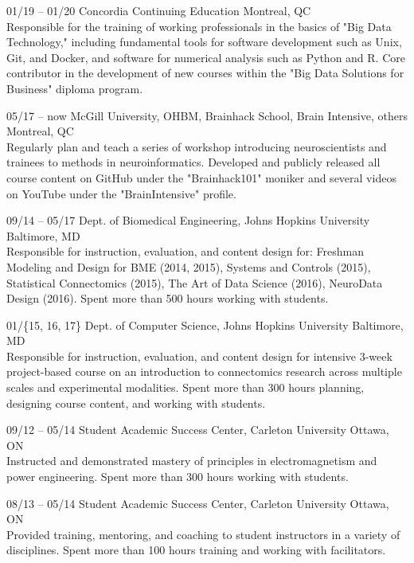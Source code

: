 \documentclass[]{friggeri-cv} %
\begin{document}
\begin{entrylist}
\entry
{01/19 -- 01/20}
{Concordia Continuing Education}
{Montreal, QC}
{ \\
Responsible for the training of working professionals in the basics of "Big Data Technology," including fundamental
tools for software development such as Unix, Git, and Docker, and software for numerical analysis such as Python and R.
Core contributor in the development of new courses within the "Big Data Solutions for Business" diploma program.}

\entry
{05/17 -- now}
{McGill University, OHBM, Brainhack School, Brain Intensive, others}
{Montreal, QC}
{ \\
Regularly plan and teach a series of workshop introducing neuroscientists and trainees to methods in neuroinformatics.
Developed and publicly released all course content on GitHub under the "Brainhack101" moniker and several videos on
YouTube under the "BrainIntensive" profile.}

\entry
{09/14 -- 05/17}
{Dept. of Biomedical Engineering, Johns Hopkins University}
{Baltimore, MD}
{ \\
Responsible for instruction, evaluation, and content design for: Freshman Modeling and Design
for BME (2014, 2015), Systems and Controls (2015), Statistical Connectomics (2015), The Art of
Data Science (2016), NeuroData Design (2016). Spent more than 500 hours working with students.}

\entry
{01/\{15, 16, 17\}}
{Dept. of Computer Science, Johns Hopkins University}
{Baltimore, MD}
{\\
Responsible for instruction, evaluation, and content design for intensive 3-week project-based course on an
introduction to connectomics research across multiple scales and experimental modalities. Spent more than 300 hours
planning, designing course content, and working with students.}

\entry
{09/12 -- 05/14}
{Student Academic Success Center, Carleton University}
{Ottawa, ON}
{\\
Instructed and demonstrated mastery of principles in electromagnetism and power engineering. Spent more than 300 hours
working with students.}

\entry
{08/13 -- 05/14}
{Student Academic Success Center, Carleton University}
{Ottawa, ON}
{\\
Provided training, mentoring, and coaching to student instructors in a variety of disciplines. Spent more than 100
hours training and working with facilitators.}

\end{entrylist}
\end{document}
